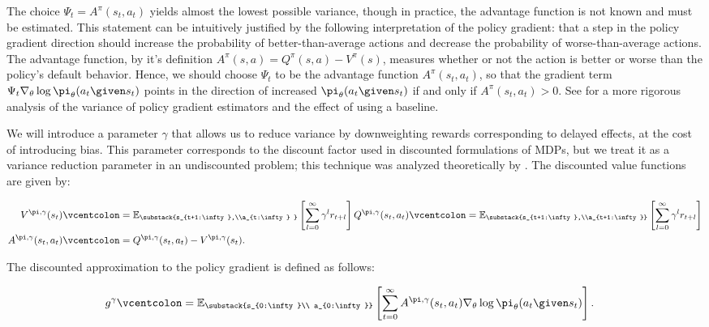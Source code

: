 The choice $\Psi_t =\ensuremath{A^{\pi}}(s_t, a_t)$ yields almost the lowest possible variance, though in practice, the advantage function is not known and must be estimated. This statement can be intuitively justified by the following interpretation of the policy gradient: that a step in the policy gradient direction should increase the probability of better-than-average actions and decrease the probability of worse-than-average actions. The advantage function, by it's definition $\ensuremath{A^{\pi}}(s,a)=\ensuremath{Q^{\pi}}(s,a)-\ensuremath{V^{\pi}}(s)$, measures whether or not the action is better or worse than the policy's default behavior. Hence, we should choose $\Psi_t$ to be the advantage function $\ensuremath{A^{\pi}}(s_t, a_t)$, so that the gradient term $\Psi_t \nabla_{\theta} \log \pi_{\theta}(a_t \given s_t)$ points in the direction of increased $\pi_{\theta}(a_t \given s_t)$ if and only if $\ensuremath{A^{\pi}}(s_t, a_t)>0$. See \cite{greensmith2004variance} for a more rigorous analysis of the variance of policy gradient estimators and the effect of using a baseline.

We will introduce a parameter $\gamma$ that allows us to reduce variance by downweighting rewards corresponding to delayed effects, at the cost of introducing bias. This parameter corresponds to the discount factor used in discounted formulations of MDPs, but we treat it as a variance reduction parameter in an undiscounted problem; this technique was analyzed theoretically by \cite{marbach2003approximate,kakade2001optimizing,thomas2014bias}. The discounted value functions are given by:

\begin{align}
V^{\pi,\gamma}(s_t) &\vcentcolon= \mathbb{E}_{\substack{s_{t+1:\infty},\\a_{t:\infty} } }\left[\sum_{l=0}^{\infty} \gamma^{l} r_{t+l}\right]
Q^{\pi,\gamma}(s_t,a_t) \vcentcolon= \mathbb{E}_{\substack{s_{t+1:\infty},\\a_{t+1:\infty}}}\left[\sum_{l=0}^{\infty} \gamma^{l} r_{t+l}\right]\\
A^{\pi,\gamma}(s_t, a_t)&\vcentcolon=Q^{\pi,\gamma}(s_t,a_t) - V^{\pi,\gamma}(s_t).
\end{align}

The discounted approximation to the policy gradient is defined as follows:

\begin{align}
g^{\gamma}
&\vcentcolon= \mathbb{E}_{\substack{s_{0:\infty}\\ a_{0:\infty}}}\left[ \sum_{t=0}^{\infty}A^{\pi,\gamma}(s_t,a_t) \nabla_{\theta} \log \pi_{\theta}(a_t \given s_t)\right].
\label{eq:pg-adv-biased}
\end{align}

